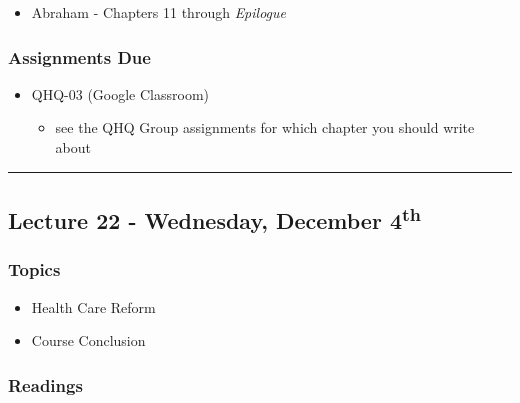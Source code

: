 \documentclass[]{book}
\providecommand{\tightlist}{%
  \setlength{\itemsep}{0pt}\setlength{\parskip}{0pt}}
\begin{document}
\begin{itemize}
\tightlist
\item
  Abraham - Chapters 11 through \emph{Epilogue}
\end{itemize}

\hypertarget{assignments-due-5}{%
\subsubsection*{Assignments Due}\label{assignments-due-5}}

\begin{itemize}
\tightlist
\item
  QHQ-03 (Google Classroom)

  \begin{itemize}
  \tightlist
  \item
    see the QHQ Group assignments for which chapter you should write about
  \end{itemize}
\end{itemize}

\begin{center}\rule{0.5\linewidth}{\linethickness}\end{center}

\hypertarget{lecture-22---wednesday-december-4th}{%
\subsection*{\texorpdfstring{Lecture 22 - Wednesday, December 4\textsuperscript{th}}{Lecture 22 - Wednesday, December 4th}}\label{lecture-22---wednesday-december-4th}}

\hypertarget{topics-29}{%
\subsubsection*{Topics}\label{topics-29}}

\begin{itemize}
\tightlist
\item
  Health Care Reform
\item
  Course Conclusion
\end{itemize}

\hypertarget{readings-27}{%
\subsubsection*{Readings}\label{readings-27}}
\end{document}
